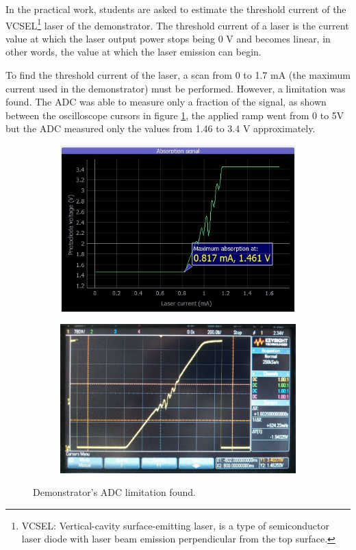 \documentclass[a4paper,12pt]{article}
\begin{document}
In the practical work, students are asked to estimate the threshold current of the VCSEL\footnote{VCSEL: Vertical-cavity surface-emitting laser, is a type of semiconductor laser diode with laser beam emission perpendicular from the top surface.} laser of the demonstrator. The threshold current of a laser is the current value at which the laser output power stops being 0 V and becomes linear, in other words, the value at which the laser emission can begin.

To find the threshold current of the laser, a scan from 0 to 1.7 mA (the maximum current used in the demonstrator) must be performed. However, a limitation was found. The ADC was able to measure only a fraction of the signal, as shown between the oscilloscope cursors in figure \ref{fig:adc_limitation}, the applied ramp went from 0 to 5V but the ADC measured only the values from 1.46 to 3.4 V approximately.
\begin{figure}[!h]
\centering
\begin{subfigure}[b]{0.49\textwidth}
	\centering
	\includegraphics[height=0.6\textwidth]{Images/fsr_screenshot.jpg}
	\captionsetup{justification=centering}
\end{subfigure}
\hfill
\begin{subfigure}[b]{0.49\textwidth}
	\centering
	\includegraphics[height=0.6\textwidth]{Images/fsr_oscilloscope.jpeg}
	\captionsetup{justification=centering}
\end{subfigure}
 \caption{Demonstrator's ADC limitation found.}
\label{fig:adc_limitation}
\end{figure}
\end{document}
